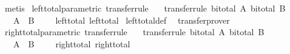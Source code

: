 \begin{isabellebody}
\isamarkupfalse%
\ metis%
\endisatagproof
{\isafoldproof}%
%
\isadelimproof
\isanewline
%
\endisadelimproof
\isanewline
{}\isamarkupfalse%
\ left{\isacharunderscore}{\kern0pt}total{\isacharunderscore}{\kern0pt}parametric\ {\isacharbrackleft}{\kern0pt}transfer{\isacharunderscore}{\kern0pt}rule{\isacharbrackright}{\kern0pt}{\isacharcolon}{\kern0pt}\isanewline
\ \ \ {\isacharbrackleft}{\kern0pt}transfer{\isacharunderscore}{\kern0pt}rule{\isacharbrackright}{\kern0pt}{\isacharcolon}{\kern0pt}\ {\isachardoublequoteopen}bi{\isacharunderscore}{\kern0pt}total\ A{\isachardoublequoteclose}\ {\isachardoublequoteopen}bi{\isacharunderscore}{\kern0pt}total\ B{\isachardoublequoteclose}\isanewline
\ \ \ {\isachardoublequoteopen}{\isacharparenleft}{\kern0pt}{\isacharparenleft}{\kern0pt}A\ {\isacharequal}{\kern0pt}{\isacharequal}{\kern0pt}{\isacharequal}{\kern0pt}{\isachargreater}{\kern0pt}\ B\ {\isacharequal}{\kern0pt}{\isacharequal}{\kern0pt}{\isacharequal}{\kern0pt}{\isachargreater}{\kern0pt}\ {\isacharparenleft}{\kern0pt}{\isacharequal}{\kern0pt}{\isacharparenright}{\kern0pt}{\isacharparenright}{\kern0pt}\ {\isacharequal}{\kern0pt}{\isacharequal}{\kern0pt}{\isacharequal}{\kern0pt}{\isachargreater}{\kern0pt}\ {\isacharparenleft}{\kern0pt}{\isacharequal}{\kern0pt}{\isacharparenright}{\kern0pt}{\isacharparenright}{\kern0pt}\ left{\isacharunderscore}{\kern0pt}total\ left{\isacharunderscore}{\kern0pt}total{\isachardoublequoteclose}\isanewline
%
\isadelimproof
%
\endisadelimproof
%
\isatagproof
{}\isamarkupfalse%
\ left{\isacharunderscore}{\kern0pt}total{\isacharunderscore}{\kern0pt}def\ \isamarkupfalse%
\ transfer{\isacharunderscore}{\kern0pt}prover%
\endisatagproof
{\isafoldproof}%
%
\isadelimproof
\isanewline
%
\endisadelimproof
\isanewline
{}\isamarkupfalse%
\ right{\isacharunderscore}{\kern0pt}total{\isacharunderscore}{\kern0pt}parametric\ {\isacharbrackleft}{\kern0pt}transfer{\isacharunderscore}{\kern0pt}rule{\isacharbrackright}{\kern0pt}{\isacharcolon}{\kern0pt}\isanewline
\ \ \ {\isacharbrackleft}{\kern0pt}transfer{\isacharunderscore}{\kern0pt}rule{\isacharbrackright}{\kern0pt}{\isacharcolon}{\kern0pt}\ {\isachardoublequoteopen}bi{\isacharunderscore}{\kern0pt}total\ A{\isachardoublequoteclose}\ {\isachardoublequoteopen}bi{\isacharunderscore}{\kern0pt}total\ B{\isachardoublequoteclose}\isanewline
\ \ \ {\isachardoublequoteopen}{\isacharparenleft}{\kern0pt}{\isacharparenleft}{\kern0pt}A\ {\isacharequal}{\kern0pt}{\isacharequal}{\kern0pt}{\isacharequal}{\kern0pt}{\isachargreater}{\kern0pt}\ B\ {\isacharequal}{\kern0pt}{\isacharequal}{\kern0pt}{\isacharequal}{\kern0pt}{\isachargreater}{\kern0pt}\ {\isacharparenleft}{\kern0pt}{\isacharequal}{\kern0pt}{\isacharparenright}{\kern0pt}{\isacharparenright}{\kern0pt}\ {\isacharequal}{\kern0pt}{\isacharequal}{\kern0pt}{\isacharequal}{\kern0pt}{\isachargreater}{\kern0pt}\ {\isacharparenleft}{\kern0pt}{\isacharequal}{\kern0pt}{\isacharparenright}{\kern0pt}{\isacharparenright}{\kern0pt}\ right{\isacharunderscore}{\kern0pt}total\ right{\isacharunderscore}{\kern0pt}total{\isachardoublequoteclose}\isanewline

\end{isabellebody}
